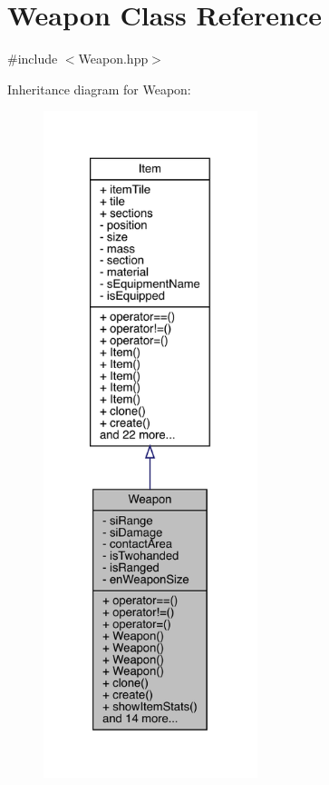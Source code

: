 \hypertarget{class_weapon}{}\section{Weapon Class Reference}
\label{class_weapon}


{\ttfamily \#include $<$Weapon.\+hpp$>$}



Inheritance diagram for Weapon\+:
\nopagebreak
\begin{figure}[H]
\begin{center}
\leavevmode
\includegraphics[height=550pt]{d4/d3b/class_weapon__inherit__graph}
\end{center}
\end{figure}



